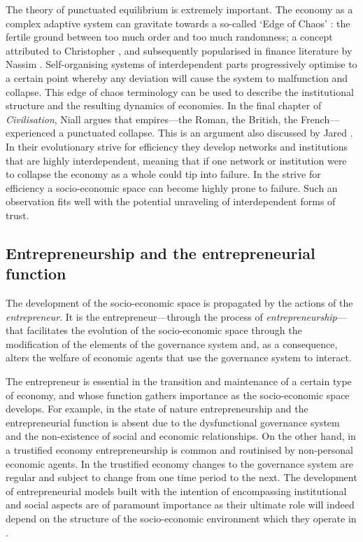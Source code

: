 The theory of punctuated equilibrium is extremely important. The economy as a complex adaptive system can gravitate towards a so-called `Edge of Chaos' : the fertile ground between too much order and too much randomness; a concept attributed to Christopher \citet{Langton1990}, and subsequently popularised in finance literature by Nassim \citet{Taleb2007, Taleb2013}. Self-organising systems of interdependent parts progressively optimise to a certain point whereby any deviation will cause the system to malfunction and collapse. This edge of chaos terminology can be used to describe the institutional structure and the resulting dynamics of economies. In the final chapter of \emph{Civilisation}, Niall \citet{Ferguson2011} argues that empires---the Roman, the British, the French---experienced a punctuated collapse. This is an argument also discussed by Jared \citet{Diamond2011}. In their evolutionary strive for efficiency they develop networks and institutions that are highly interdependent, meaning that if one network or institution were to collapse the economy as a whole could tip into failure. In the strive for efficiency a socio-economic space can become highly prone to failure. Such an observation fits well with the potential unraveling of interdependent forms of trust.

\subsection{Entrepreneurship and the entrepreneurial function}
\label{sec:entrepreneurship}

The development of the socio-economic space is propagated by the actions of the \emph{entrepreneur}. It is the entrepreneur---through the process of \emph{entrepreneurship}---that facilitates the evolution of the socio-economic space through the modification of the elements of the governance system and, as a consequence, alters the welfare of economic agents that use the governance system to interact. 

The entrepreneur is essential in the transition and maintenance of a certain type of economy, and whose function gathers importance as the socio-economic space develops. For example, in the state of nature entrepreneurship and the entrepreneurial function is absent due to the dysfunctional governance system and the non-existence of social and economic relationships. On the other hand, in a trustified economy entrepreneurship is common and routinised by non-personal economic agents. In the trustified economy changes to the governance system are regular and subject to change from one time period to the next. The development of entrepreneurial models built with the intention of encompassing institutional and social aspects are of paramount importance as their ultimate role will indeed depend on the structure of the socio-economic environment which they operate in \citep{AldrichMartinez2007}.

